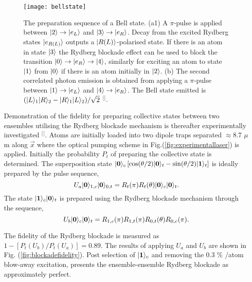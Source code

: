 \begin{figure}[b]
\centering
\texttt{[image: bellstate]}
\caption{\label{fig:bellstate} The preparation sequence of a Bell state. (a1) A $\pi$-pulse is applied between $\lvert2\rangle \rightarrow \lvert e_{L}\rangle$ and $\lvert3\rangle \rightarrow \lvert e_{R}\rangle$. Decay from the excited Rydberg states $\lvert e_{R(L)}\rangle$ outputs a $\lvert R(L)\rangle$-polarised state. If there is an atom in state $\lvert3\rangle$ the Rydberg blockade effect can be used to block the transition $\lvert0\rangle \rightarrow \lvert e_{R}\rangle \rightarrow \lvert4\rangle$, similarly for exciting an atom to state $\lvert1\rangle$ from $\lvert0\rangle$ if there is an atom initially in $\lvert2\rangle$. (b) The second correlated photon emission is obtained from applying a $\pi$-pulse between $\lvert1\rangle \rightarrow \lvert e_{L}\rangle$ and $\lvert4\rangle \rightarrow \lvert e_{R}\rangle$. The Bell state emitted is $(\lvert L\rangle_{1}\lvert R\rangle_{2}-\lvert R\rangle_{1}\lvert L\rangle_{2})/\sqrt{2}$ $^{[}$\citep{Nielsen2010DeterministicProcessing}$^{]}$.}
\end{figure}

Demonstration of the fidelity for preparing collective states between two ensembles utilising the Rydberg blockade mechanism is thereafter experimentally investigated $^{[}$\citep{Ebert2015CoherenceQubits}$^{]}$. Atoms are initially loaded into two dipole traps separated $\approx$8.7 $\mu$m along $\vec{x}$ where the optical pumping scheme in Fig.(\ref{fig:experimentallaser}) is applied. Initially the probability $P_{t}$ of preparing the collective state is determined. The superposition state $\lvert\textbf{0}\rangle_{c} \left [ \cos (\theta /2) \lvert\textbf{0}\rangle_{t}-\sin (\theta /2)\lvert\textbf{1}\rangle_{t} \right ]$ is ideally prepared by the pulse sequence,
\begin{equation}
\label{eq:pulsesequence1}
U_{a}\lvert\textbf{0}\rangle_{1,c}\lvert\textbf{0}\rangle_{0,t}=R_{t}(\pi)R_{t}(\theta)\lvert\textbf{0}\rangle_{c}\lvert\textbf{0}\rangle_{t}.
\end{equation}
\noindent The state $\lvert\textbf{1}\rangle_{c}\lvert\textbf{0}\rangle_{t}$ is prepared using the Rydberg blockade mechanism through the sequence,
\begin{equation}
\label{eq:pulsesequence1}
U_{b}\lvert\textbf{0}\rangle_{c}\lvert\textbf{0}\rangle_{t}=R_{1,c}(\pi)R_{1,t}(\pi)R_{0,t}(\theta)R_{0,c}(\pi).
\end{equation}

\noindent The fidelity of the Rydberg blockade is measured as $1-\left [ P_{t}(U_{b})/P_{t}(U_{a}) \right ]=0.89$. The results of applying $U_{a}$ and $U_{b}$ are shown in Fig. (\ref{fig:blockadefidelity}). Post selection of $\lvert\textbf{1}\rangle_{c}$ and removing the 0.3 \% /atom blow-away excitation, presents the ensemble-ensemble Rydberg blockade as approximately perfect. 

